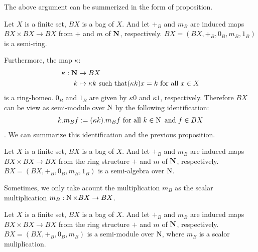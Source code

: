 The above argument can be summerized in the form of proposition.

\begin{proposition}
Let $X$ is a finite set, $BX$ is a bag of $X$.
And let $+_B$ and $m_B$ are induced maps $BX\times BX\to BX$ 
from $+$ and $m$ of ${\mathbf{N}}$, respectively.
$BX=(BX,+_B,0_B,m_B,1_B)$ is a semi-ring.
\end{proposition}

Furthermore, the map $\kappa$:
\begin{equation}\begin{split}
	\kappa: {\mathbf{N}} &\to BX \\
		k &\mapsto \kappa k \text{ such that} 
			(\kappa k)x = k \text{ for all }x\in X \\
\end{split}\end{equation}
is a ring-homeo.
$0_B$ and $1_B$ are given by $\kappa 0$ and $\kappa 1$, respectively.
Therefore $BX$ can be view as semi-module over $\operatorname{N}$ by the following 
identification:
\begin{equation}\begin{split}
	k.m_Bf := (\kappa k).m_Bf \text{ for all }k\in \operatorname{N} \text{ and }f\in BX
\end{split}\end{equation}
. We can summarize this identification and the previous proposition.

\begin{proposition}
Let $X$ is a finite set, $BX$ is a bag of $X$.
And let $+_B$ and $m_B$ are induced maps $BX\times BX\to BX$ 
from the ring structure $+$ and $m$ of ${\mathbf{N}}$, respectively.
$BX=(BX,+_B,0_B,m_B,1_B)$ is a semi-algebra over $\operatorname{N}$.
\end{proposition}

Sometimes, we only take acount the multiplication $m_B$ as the scalar 
multiplication $m_B:\operatorname{N}\times BX\to BX$.

\begin{proposition}
Let $X$ is a finite set, $BX$ is a bag of $X$.
And let $+_B$ and $m_B$ are induced maps $BX\times BX\to BX$ 
from the ring structure $+$ and $m$ of ${\mathbf{N}}$, respectively.
$BX=(BX,+_B,0_B,m_B)$ is a semi-module over $\operatorname{N}$, where
$m_B$ is a scalor muliplication.
\end{proposition}

